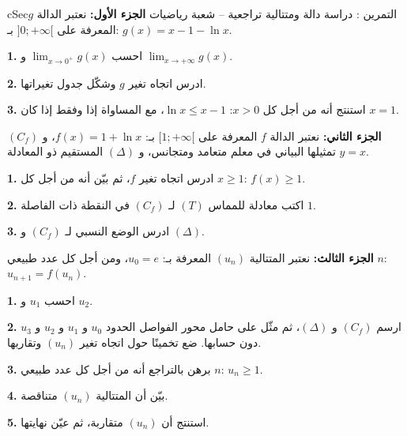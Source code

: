 \documentclass[12pt,a4paper]{article}
\newenvironment{BOX}[2]{\begin{otherlanguage}{english}\begin{arbox}{#1}{#2}}{\end{arbox}\end{otherlanguage}}
\newcounter{exo}
\newenvironment{tamrin}[1]{\stepcounter{exo}\begin{BOX}{cSec}{التمرين \theexo: #1}}{\end{BOX}}
\newcommand{\QQ}[1]{\par\smallskip\textbf{#1.} }
\begin{document}
\begin{tamrin}{دراسة دالة ومتتالية تراجعية -- شعبة رياضيات}
\textbf{الجزء الأول:} نعتبر الدالة $g$ المعرفة على $]0;+\infty[$ بـ: $g(x)=x-1-\ln x$.
\QQ{1} احسب $\displaystyle\lim_{x\to0^+}g(x)$ و $\displaystyle\lim_{x\to+\infty}g(x)$.
\QQ{2} ادرس اتجاه تغير $g$ وشكّل جدول تغيراتها.
\QQ{3} استنتج أنه من أجل كل $x>0$: $\ln x\leqslant x-1$، مع المساواة إذا وفقط إذا كان $x=1$.

\textbf{الجزء الثاني:} نعتبر الدالة $f$ المعرفة على $[1;+\infty[$ بـ: $f(x)=1+\ln x$، و $(C_f)$ تمثيلها البياني في معلم متعامد ومتجانس، و $(\Delta)$ المستقيم ذو المعادلة $y=x$.
\QQ{1} ادرس اتجاه تغير $f$، ثم بيّن أنه من أجل كل $x\geqslant1$: $f(x)\geqslant1$.
\QQ{2} اكتب معادلة للمماس $(T)$ لـ $(C_f)$ في النقطة ذات الفاصلة $1$.
\QQ{3} ادرس الوضع النسبي لـ $(C_f)$ و $(\Delta)$.

\textbf{الجزء الثالث:} نعتبر المتتالية $(u_n)$ المعرفة بـ: $u_0=e$، ومن أجل كل عدد طبيعي $n$: $u_{n+1}=f(u_n)$.
\QQ{1} احسب $u_1$ و $u_2$.
\QQ{2} ارسم $(C_f)$ و $(\Delta)$، ثم مثّل على حامل محور الفواصل الحدود $u_0$ و $u_1$ و $u_2$ و $u_3$ دون حسابها. ضع تخمينًا حول اتجاه تغير $(u_n)$ وتقاربها.
\QQ{3} برهن بالتراجع أنه من أجل كل عدد طبيعي $n$: $u_n\geqslant1$.
\QQ{4} بيّن أن المتتالية $(u_n)$ متناقصة.
\QQ{5} استنتج أن $(u_n)$ متقاربة، ثم عيّن نهايتها.
\end{tamrin}
\end{document}
